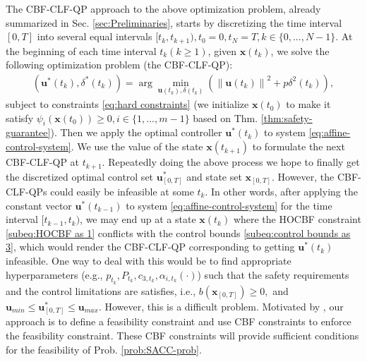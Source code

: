 \documentclass[letterpaper, 10 pt, conference]{ieeeconf}
\theoremstyle{definition}
\begin{document}
The CBF-CLF-QP approach to the above optimization problem, already summarized in Sec. \ref{sec:Preliminaries}, starts by discretizing the time interval $[0,T]$ into several equal intervals $[t_{k},t_{k+1}),t_{0}=0, t_{N}=T,k\in \{0,...,N-1\}$. 
At the beginning of each time interval $t_{k} (k\ge1)$, given 
$\boldsymbol{x}(t_{k})$, we solve the following optimization problem (the CBF-CLF-QP):
\begin{equation}
\label{eq:descritized hard constraints}
\begin{split}
(\boldsymbol{u}^{\ast}(t_{k}),\delta^{\ast}(t_{k}))=\arg \min_{\boldsymbol{u}(t_{k}),\delta(t_{k})} (\left \| \boldsymbol{u}(t_{k}) \right \| ^{2}+p\delta^{2}(t_{k})),
\end{split}
\end{equation}
subject to constraints \eqref{eq:hard constraints} (we initialize $\boldsymbol{x}(t_{0})$ to make it satisfy $\psi_{i}(\boldsymbol{x}(t_{0}))\ge 0, i\in \{1,...,m-1\}$ based on Thm. \ref{thm:safety-guarantee}). Then we apply the optimal controller $\boldsymbol{u}^{\ast}(t_{k})$ to system \eqref{eq:affine-control-system}. We use the value of the state $\boldsymbol{x}(t_{k+1})$ to formulate the next CBF-CLF-QP at $t_{k+1}.$ Repeatedly doing the above process we hope to finally get the discretized optimal control set $\boldsymbol{u}^{\ast}_{[0,T]}$ and state set $\boldsymbol{x}_{[0,T]}.$ However, the CBF-CLF-QPs could easily be infeasible at some $t_{k}$. In other words, after applying the constant vector $\boldsymbol{u}^{\ast}(t_{k-1})$ to system \eqref{eq:affine-control-system} for the time interval $[t_{k-1},t_{k})$, we may end up at a state $\boldsymbol{x}(t_{k})$ where
the HOCBF constraint \eqref{subeq:HOCBF as 1} conflicts with the control bounds \eqref{subeq:control bounds as 3}, which would render the CBF-CLF-QP corresponding to getting $\boldsymbol{u}^{\ast}(t_{k})$ infeasible. One way to deal with this would be to find appropriate hyperparameters (e.g., $p_{t_{k}},P_{t_{k}},c_{3,t_{k}},\alpha_{i,t_{k}}(\cdot)$)
such that the safety requirements and the control limitations are satisfies, i.e., $b(\boldsymbol{x}_{[0,T]})\ge 0,$ and $\boldsymbol{u}_{min}\le \boldsymbol{u}^{\ast}_{[0,T]} \le \boldsymbol{u}_{max}$. However, this is a difficult problem. 
Motivated by \cite{xiao2022sufficient}, our approach is to define a feasibility constraint and use CBF constraints to enforce the feasibility constraint. These CBF constraints will provide sufficient conditions for the feasibility of Prob. \ref{prob:SACC-prob}.
 
\end{document}
